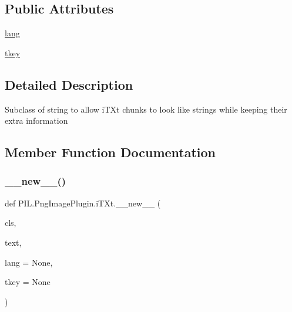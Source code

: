 \subsection*{Public Attributes}
\begin{DoxyCompactItemize}
\item 
\hyperlink{classPIL_1_1PngImagePlugin_1_1iTXt_a26a77c7ee5ba643dc915450436608f70}{lang}
\item 
\hyperlink{classPIL_1_1PngImagePlugin_1_1iTXt_aefb8b1e34bfb151cded82c8795bac2a8}{tkey}
\end{DoxyCompactItemize}


\subsection{Detailed Description}
\begin{DoxyVerb}Subclass of string to allow iTXt chunks to look like strings while
keeping their extra information\end{DoxyVerb}
 

\subsection{Member Function Documentation}
\mbox{\label{classPIL_1_1PngImagePlugin_1_1iTXt_ad03eceb05617b3f35549673beacf1c0c}} 
\subsubsection{\texorpdfstring{\+\_\+\+\_\+new\+\_\+\+\_\+()}{\_\_new\_\_()}}
{\footnotesize\ttfamily def P\+I\+L.\+Png\+Image\+Plugin.\+i\+T\+Xt.\+\_\+\+\_\+new\+\_\+\+\_\+ (\begin{DoxyParamCaption}\item[{}]{cls,  }\item[{}]{text,  }\item[{}]{lang = {\ttfamily None},  }\item[{}]{tkey = {\ttfamily None} }\end{DoxyParamCaption})\hspace{0.3cm}{\ttfamily [static]}}

